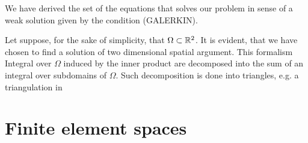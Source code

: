 \par We have derived the set of the equations that solves our problem in sense of a weak solution given by the condition (GALERKIN). 

\par Let suppose, for the sake of simplicity, that $\Omega \subset \mathbb{R}^2$. 
It is evident, that we have chosen to find a solution of two dimensional spatial argument. This formalism
Integral over $\Omega$ induced by the inner product are decomposed into the sum of an integral over subdomains of $\Omega$. 
Such decomposition is done into triangles, e.g. a triangulation in 

\section{Finite element spaces}

